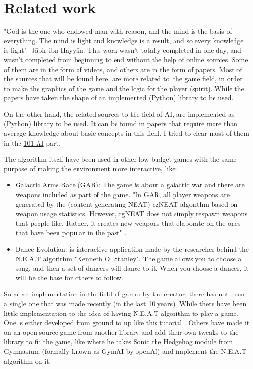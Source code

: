 \chapter{Related work}

"God is the one who endowed man with reason, and the mind is the basis of everything. The mind is light and knowledge is a result, and so every knowledge is light" -Jābir ibn Hayyān. This work wasn’t totally completed in one day, and wasn’t completed from beginning to end without the help of online sources. Some of them are in the form of videos, and others are in the form of papers. Most of the sources that will be found here, are more related to the game field, in order to make the graphics of the game and the logic for the player (spirit). While the papers have taken the shape of an implemented (Python) library to be used.

On the other hand, the related sources to the field of AI, are implemented as (Python) library to be used. It can be found in papers that require more than average knowledge about basic concepts in this field. I tried to clear most of them in the \hyperref[sec:101-ai]{101 AI} part.

The algorithm itself have been used in other low-budget games with the same purpose of making the environment more interactive, like:

\begin{itemize}
\item Galactic Arms Race (GAR): The game is about a galactic war and there are weapons included as part of the game. "In GAR, all player weapons are generated by the (content-generating NEAT) cgNEAT algorithm based on weapon usage statistics. However, cgNEAT does not simply respawn weapons that people like. Rather, it creates new weapons that elaborate on the ones that have been popular in the past" \cite{Galactic_Arms_Race:_Research}.

\item Dance Evolution: is interactive application made by the researcher behind the N.E.A.T algorithm "Kenneth O. Stanley". The game allows you to choose a song, and then a set of dancers will dance to it. When you choose a dancer, it will be the base for others to follow.

\end{itemize}

So as an implementation in the field of games by the creator, there has not been a single one that was made recently (in the last 10 years). While there have been little implementation to the idea of having N.E.A.T algorithm to play a game. One is either developed from ground to up like this tutorial \cite{Python_Pong_AI_Tutorial_-_Using_NEAT}.  Others have made it on an open source game from another library and add their own tweaks to the library to fit the game, like \cite{A.I_Learns_to_Play_Soni_the_Hedgehog_-_NEAT_Explained} where he takes Sonic the Hedgehog module from Gymnasium (formally known as GymAI by openAI) and implement the N.E.A.T algorithm on it.


